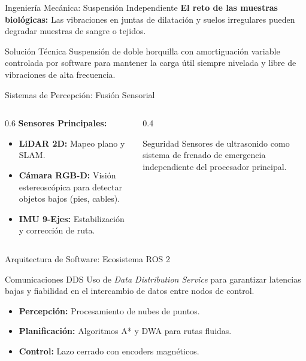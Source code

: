 \begin{frame}{Ingeniería Mecánica: Suspensión Independiente}
    \textbf{El reto de las muestras biológicas:}
    Las vibraciones en juntas de dilatación y suelos irregulares pueden degradar muestras de sangre o tejidos.
    
    \vspace{0.3cm}
    \begin{exampleblock}{Solución Técnica}
        Suspensión de doble horquilla con amortiguación variable controlada por software para mantener la carga útil siempre nivelada y libre de vibraciones de alta frecuencia.
    \end{exampleblock}
\end{frame}

\begin{frame}{Sistemas de Percepción: Fusión Sensorial}
    \begin{columns}
        \begin{column}{0.6\textwidth}
            \textbf{Sensores Principales:}
            \begin{itemize}
                \item \textbf{LiDAR 2D:} Mapeo plano y SLAM.
                \item \textbf{Cámara RGB-D:} Visión estereoscópica para detectar objetos bajos (pies, cables).
                \item \textbf{IMU 9-Ejes:} Estabilización y corrección de ruta.
            \end{itemize}
        \end{column}
        \begin{column}{0.4\textwidth}
            \begin{alertblock}{Seguridad}
                Sensores de ultrasonido como sistema de frenado de emergencia independiente del procesador principal.
            \end{alertblock}
        \end{column}
    \end{columns}
\end{frame}

\begin{frame}{Arquitectura de Software: Ecosistema ROS 2}
    \begin{block}{Comunicaciones DDS}
        Uso de \textit{Data Distribution Service} para garantizar latencias bajas y fiabilidad en el intercambio de datos entre nodos de control.
    \end{block}
    \vspace{0.3cm}
    \begin{itemize}
        \item[1.] \textbf{Percepción:} Procesamiento de nubes de puntos.
        \item[2.] \textbf{Planificación:} Algoritmos A* y DWA para rutas fluidas.
        \item[3.] \textbf{Control:} Lazo cerrado con encoders magnéticos.
    \end{itemize}
\end{frame}

